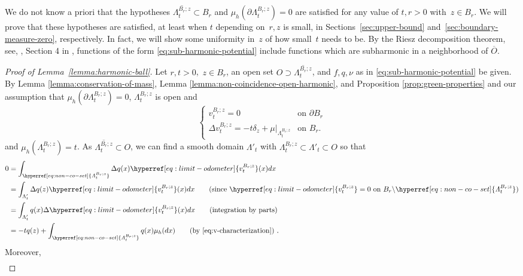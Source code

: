 \documentclass[12pt]{amsart}
\numberwithin{equation}{section}
\newcommand{\cluster}[2]{\hyperref[eq:non-co-set]{\mathit{\Lambda}^{#1}_{#2}}}
\newcommand{\odometer}[2]{\hyperref[eq:limit-odometer]{v^{#1}_{#2}}}
\begin{document}
	We do not know a priori that the hypotheses $\overline{{{\cluster{B_r;z}{t}}}} \subset B_r$ and $\mu_h(\partial{\cluster{B_r;z}{t}}) = 0$ are satisfied for any value of $t, r>0$ with~$z \in B_r$. We will prove that these hypotheses are satisfied, at least when $t$ depending on~$r, z$ is small, in Sections~\ref{sec:upper-bound} and~\ref{sec:boundary-measure-zero}, respectively. In fact, we will show some uniformity in~$z$ of how small~$t$ needs to be.
	By the Riesz decomposition theorem, see, \eg, Section 4 in \cite{armitage2000classical}, functions of the form \eqref{eq:sub-harmonic-potential}
	include functions which are subharmonic in a neighborhood of $\overline{O}$.
	
	\begin{proof}[Proof of Lemma~\ref{lemma:harmonic-ball}]
		Let $r,t > 0$,~$z \in B_r$, an open set $O \supset \overline{{{\cluster{B_r; z}{t}}}}$, and $f, q, \nu$ as in \eqref{eq:sub-harmonic-potential} be given. By Lemma \ref{lemma:conservation-of-mass}, Lemma \ref{lemma:non-coincidence-open-harmonic}, and Proposition \ref{prop:green-properties} and our assumption that $\mu_h(\partial {\cluster{B_r;z}{t}}) = 0$, ${\cluster{B_r;z}{t}}$ is open and 
		\begin{equation} \label{eq:v-characterization}
		\begin{cases}
		\odometer{B_r;z}{t} = 0  &\mbox{on $\partial B_r$} \\
		\Delta \odometer{B_r;z}{t} = -t \delta_z + \mu|_{{{\cluster{B_r;z}{t}}}} &\mbox{on $B_r$}.
		\end{cases}
		\end{equation}
		and $\mu_h({\cluster{B_r;z}{t}}) = t$. As $\overline{{{\cluster{B_r;z}{t}}}} \subset O$, we can find a smooth domain $\Lambda'_t$ with ${\cluster{B_r;z}{t}} \subset \Lambda'_t \subset O$
		so that
		\begin{align*}
		0 &= \int_{{{\cluster{B_r;z}{t}}}} \Delta q(x) \odometer{B_r;z}{t}(x) dx \\
		&= \int_{\Lambda_t'} \Delta q(z) \odometer{B_r;z}{t}(x) dx  \qquad \mbox{(since $\odometer{B_r;z}{t} = 0$ on $B_r \backslash {\cluster{B_r;z }{t}}$)} \\
		&= \int_{\Lambda_t'} q(x) \Delta \odometer{B_r;z}{t}(x)dx  \qquad \mbox{(integration by parts)} \\ 
		&= -t q(z) + \int_{{{\cluster{B_r;z}{t}}}} q(x) \mu_h(dx) \qquad \mbox{(by \eqref{eq:v-characterization}) } .
		\end{align*}
		Moreover, 
		\begin{align*}

\end{align*}
\end{proof}
\end{document}
